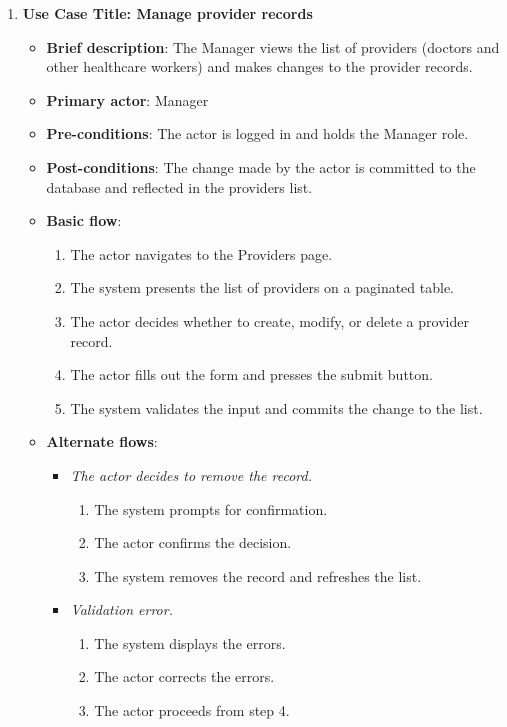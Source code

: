 \begin{enumerate}
\item \textbf{Use Case Title: Manage provider records}
\begin{itemize}
    \item \textbf{Brief description}: The Manager views the list of providers (doctors and other healthcare workers) and makes changes to the provider records.
    \item \textbf{Primary actor}: Manager
    \item \textbf{Pre-conditions}: The actor is logged in and holds the Manager role.
    \item \textbf{Post-conditions}: The change made by the actor is committed to the database and reflected in the providers list.
    \item \textbf{Basic flow}:
    \begin{enumerate}
        \item The actor navigates to the Providers page.
        \item The system presents the list of providers on a paginated table.
        \item The actor decides whether to create, modify, or delete a provider record.
        \item The actor fills out the form and presses the submit button.
        \item The system validates the input and commits the change to the list.
    \end{enumerate}
    \item \textbf{Alternate flows}:
    \begin{itemize}
        \item[3a.] \textit{The actor decides to remove the record.}
        \begin{enumerate}
            \item The system prompts for confirmation.
            \item The actor confirms the decision.
            \item The system removes the record and refreshes the list.
        \end{enumerate}
        \item[5a.] \textit{Validation error.}
        \begin{enumerate}
            \item The system displays the errors.
            \item The actor corrects the errors.
            \item The actor proceeds from step 4.
        \end{enumerate}
    \end{itemize}
\end{itemize}


\end{enumerate}
